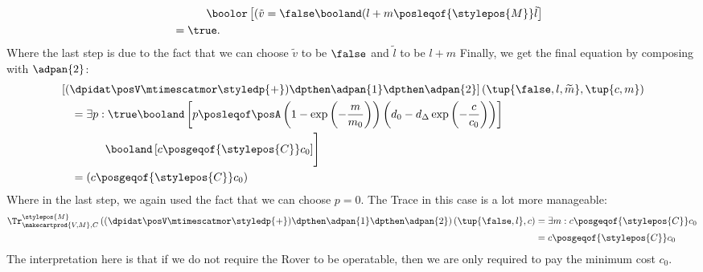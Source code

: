 {\begin{example}
\begin{align}
        & \qquad \qquad \boolor\left[(\tilde{v} = \false \booland (l + m \posleqof{\stylepos{M}} \tilde{l}\right]\\
        &\quad = \true
    .\end{align} 
    Where the last step is due to the fact that we can choose $\widetilde{v}$ to be $\false$ and $\tilde{l}$ to be $l+m$
    Finally, we get the final equation by composing with $\adpan{2}$: 
    \begin{alignat}{2}
        & \left[(\dpidat\posV \mtimescatmor \styledp{+})\dpthen \adpan{1} \dpthen \adpan{2}\right] \left( \tup{\false, l,\widetilde{m}}, \tup{c,m}\right) \\
        &\quad  = \exists p : \true \booland  \left[ p \posleqof\posA \left(1 - \exp\left(-\frac{m}{m_0}\right)\right)\left(d_0 - d_\Delta \exp\left(-\frac{c}{c_0}\right)\right)\right] \notag \\
        & \qquad \qquad \booland \left[ c \posgeqof{\stylepos{C}} c_0\right]\Biggr]\\
        & \quad = (c \posgeqof{\stylepos{C}}c_0)
    \end{alignat}
    Where in the last step, we again used the fact that we can choose $p=0$. 
    The Trace in this case is a lot more manageable:
    \begin{align}
        \Tr_{\makecartprod{V,M}, C}^{\stylepos{M}}\left((\dpidat\posV \mtimescatmor \styledp{+})\dpthen \adpan{1} \dpthen \adpan{2}\right)(\tup{\false, l}, c) &= \exists m : c \posgeqof{\stylepos{C}} c_0 \notag\\
        &= c \posgeqof{\stylepos{C}} c_0
    \end{align}
    The interpretation here is that if we do not require the Rover to be operatable, then we are only required to pay the minimum cost $c_0$. 
\end{example}
}
